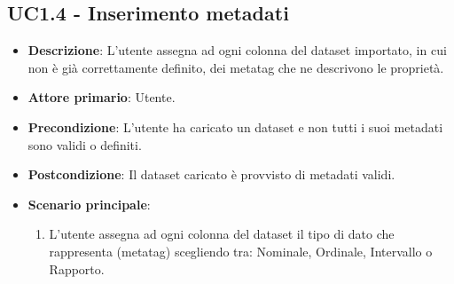 \subsection{UC1.4 - Inserimento metadati}
\label{subsec:UC1.4}
\begin{itemize}
    \item \textbf{Descrizione}: L'utente assegna ad ogni colonna del dataset importato,
                                in cui non è già correttamente definito,
                                dei metatag che ne descrivono le proprietà.


    \item \textbf{Attore primario}: Utente.
    
    \item \textbf{Precondizione}:   L'utente ha caricato un dataset e non tutti i suoi metadati sono validi o definiti.
    \item \textbf{Postcondizione}:  Il dataset caricato è provvisto di metadati validi. 

	\item \textbf{Scenario principale}:
		\begin{enumerate}
            \item L'utente assegna ad ogni colonna del dataset il tipo di dato che rappresenta (metatag) scegliendo tra:
                    Nominale, Ordinale, Intervallo o Rapporto.
        \end{enumerate}

\end{itemize}

